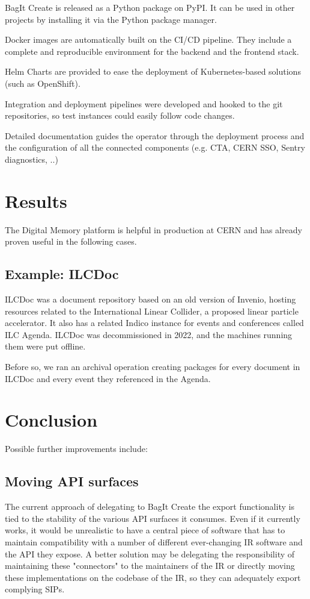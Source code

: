 \documentclass[11pt]{IEEEtran}
\begin{document}
BagIt Create is released as a Python package on PyPI. It can be used in other projects by installing it via the Python package manager.

Docker images are automatically built on the CI/CD pipeline. They include a complete and reproducible environment for the backend and the frontend stack.

Helm Charts are provided to ease the deployment of Kubernetes-based solutions (such as OpenShift).


Integration and deployment pipelines were developed and hooked to the git repositories, so test instances could easily follow code changes.

Detailed documentation guides the operator through the deployment process and the configuration of all the connected components (e.g. CTA, CERN SSO, Sentry diagnostics, ..)


\section{Results}

The Digital Memory platform is helpful in production at CERN and has already proven useful in the following cases. 

\subsection{Example: ILCDoc}

ILCDoc was a document repository based on an old version of Invenio, hosting resources related to the International Linear Collider, a proposed linear particle accelerator. It also has a related Indico instance for events and conferences called ILC Agenda.
ILCDoc was decommissioned in 2022, and the machines running them were put offline.

Before so, we ran an archival operation creating packages for every document in ILCDoc and every event they referenced in the Agenda.





\section{Conclusion}

Possible further improvements include:

\subsection{Moving API surfaces}
The current approach of delegating to BagIt Create the export functionality is tied to the stability of the various API surfaces it consumes. Even if it currently works, it would be unrealistic to have a central piece of software that has to maintain compatibility with a number of different ever-changing IR software and the API they expose. A better solution may be delegating the responsibility of maintaining these "connectors" to the maintainers of the IR or directly moving these implementations on the codebase of the IR, so they can adequately export complying SIPs.
\end{document}

